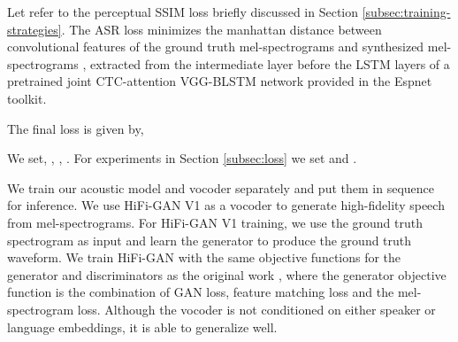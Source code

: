\documentclass{article}
\begin{document}
Let  refer to the perceptual SSIM loss briefly discussed in Section \ref{subsec:training-strategies}. The ASR loss  minimizes the manhattan distance between convolutional features  of the ground truth mel-spectrograms  and synthesized mel-spectrograms ,
extracted from the intermediate layer before the LSTM layers of a pretrained joint CTC-attention VGG-BLSTM network provided in the Espnet toolkit.

The final loss  is given by,

We set, , , . For experiments in Section \ref{subsec:loss} we set  and .

We train our acoustic model and vocoder separately and put them in sequence for inference. We use HiFi-GAN V1 \cite{kong2020hifi} as a vocoder to generate high-fidelity speech from mel-spectrograms. For HiFi-GAN V1 training, we use the ground truth spectrogram as input and learn the generator to produce the ground truth waveform. We train HiFi-GAN with the same objective functions for the generator and discriminators as the original work \cite{kong2020hifi}, where the generator objective function is the combination of GAN loss, feature matching loss and the mel-spectrogram loss. Although the vocoder is not conditioned on either speaker or language embeddings, it is able to generalize well. 
\end{document}
